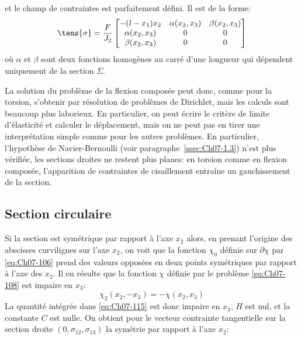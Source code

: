et le champ de contraintes est parfaitement défini.
Il est de la forme: 
\begin{equation}
    \tens{\sigma} = \frac{F}{J_2} 
    \begin{bmatrix}
        -(l-x_1) x_2 & \alpha(x_2,x_3) & \beta(x_2, x_3) \\
        \alpha(x_2,x_3) & 0 & 0 \\
        \beta(x_2,x_3) & 0 & 0
    \end{bmatrix}
    \label{eq:Ch07-117}
\end{equation}
où $\alpha$ et $\beta$ sont deux fonctions homogènes au carré d'une longueur qui dépendent uniquement de la section $\Sigma$.

La solution du problème de la flexion composée peut donc, comme pour la torsion, s'obtenir par résolution de problèmes de Dirichlet, mais les calculs sont beaucoup plus laborieux.
En particulier, on peut écrire le critère de limite d'élasticité et calculer le déplacement, mais on ne peut pas en tirer une interprétation simple comme pour les autres problèmes.
En particulier, l'hypothèse de Navier-Bernoulli (voir paragraphe~\ref{ssec:Ch07-1.3}) n'est plus vérifiée, les sections droites ne restent plus planes: en torsion comme en flexion composée, l'apparition de contraintes de cisaillement entraîne un gauchissement de la section.

\subsection{Section circulaire}
Si la section est symétrique par rapport à l'axe $x_2$ alors, en prenant l'origine des abscisses curvilignes sur l'axe $x_2$, on voit que la fonction $\chi_0$ définie sur $\partial \chi$ par \eqref{eq:Ch07-106} prend des valeurs opposées en deux points symétriques par rapport à l'axe des $x_2$.
Il en résulte que la fonction $\chi$ définie par le problème \eqref{eq:Ch07-108} est impaire en $x_3$:
\begin{equation}
    \chi_2 (x_2,-x_3) = - \chi (x_2, x_3)
    \label{eq:Ch07-118}
\end{equation}
La quantité intégrée dans \eqref{eq:Ch07-115} est donc impaire en $x_3$, $H$ est nul, et la constante $C$ est nulle.
On obtient pour le vecteur contrainte tangentielle sur la section droite $\left( 0,\sigma_{12}, \sigma_{13} \right)$ la symétrie par rapport à l'axe $x_2$:

